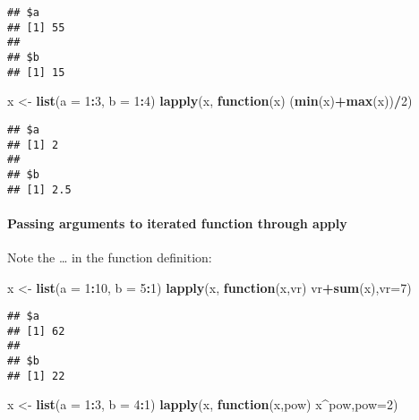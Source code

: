 \documentclass[
]{article}
\newenvironment{Shaded}{\begin{snugshade}}{\end{snugshade}}
\newcommand{\AttributeTok}[1]{\textcolor[rgb]{0.13,0.29,0.53}{#1}}
\newcommand{\ControlFlowTok}[1]{\textcolor[rgb]{0.13,0.29,0.53}{\textbf{#1}}}
\newcommand{\DecValTok}[1]{\textcolor[rgb]{0.00,0.00,0.81}{#1}}
\newcommand{\FunctionTok}[1]{\textcolor[rgb]{0.13,0.29,0.53}{\textbf{#1}}}
\newcommand{\NormalTok}[1]{#1}
\newcommand{\OtherTok}[1]{\textcolor[rgb]{0.56,0.35,0.01}{#1}}
\newcommand{\SpecialCharTok}[1]{\textcolor[rgb]{0.81,0.36,0.00}{\textbf{#1}}}
\begin{document}
\begin{verbatim}
## $a
## [1] 55
## 
## $b
## [1] 15
\end{verbatim}

\begin{Shaded}
\begin{Highlighting}[]
\NormalTok{x }\OtherTok{\textless{}{-}} \FunctionTok{list}\NormalTok{(}\AttributeTok{a =} \DecValTok{1}\SpecialCharTok{:}\DecValTok{3}\NormalTok{, }\AttributeTok{b =} \DecValTok{1}\SpecialCharTok{:}\DecValTok{4}\NormalTok{)}
\FunctionTok{lapply}\NormalTok{(x, }\ControlFlowTok{function}\NormalTok{(x) (}\FunctionTok{min}\NormalTok{(x)}\SpecialCharTok{+}\FunctionTok{max}\NormalTok{(x))}\SpecialCharTok{/}\DecValTok{2}\NormalTok{)}
\end{Highlighting}
\end{Shaded}

\begin{verbatim}
## $a
## [1] 2
## 
## $b
## [1] 2.5
\end{verbatim}

\hypertarget{passing-arguments-to-iterated-function-through-apply-1}{%
\paragraph{Passing arguments to iterated function through
apply}\label{passing-arguments-to-iterated-function-through-apply-1}}

Note the \ldots{} in the function definition:

\begin{Shaded}
\begin{Highlighting}[]
\NormalTok{x }\OtherTok{\textless{}{-}} \FunctionTok{list}\NormalTok{(}\AttributeTok{a =} \DecValTok{1}\SpecialCharTok{:}\DecValTok{10}\NormalTok{, }\AttributeTok{b =} \DecValTok{5}\SpecialCharTok{:}\DecValTok{1}\NormalTok{)}
\FunctionTok{lapply}\NormalTok{(x, }\ControlFlowTok{function}\NormalTok{(x,vr) vr}\SpecialCharTok{+}\FunctionTok{sum}\NormalTok{(x),}\AttributeTok{vr=}\DecValTok{7}\NormalTok{)}
\end{Highlighting}
\end{Shaded}

\begin{verbatim}
## $a
## [1] 62
## 
## $b
## [1] 22
\end{verbatim}

\begin{Shaded}
\begin{Highlighting}[]
\NormalTok{x }\OtherTok{\textless{}{-}} \FunctionTok{list}\NormalTok{(}\AttributeTok{a =} \DecValTok{1}\SpecialCharTok{:}\DecValTok{3}\NormalTok{, }\AttributeTok{b =} \DecValTok{4}\SpecialCharTok{:}\DecValTok{1}\NormalTok{)}
\FunctionTok{lapply}\NormalTok{(x, }\ControlFlowTok{function}\NormalTok{(x,pow) x}\SpecialCharTok{\^{}}\NormalTok{pow,}\AttributeTok{pow=}\DecValTok{2}\NormalTok{)}
\end{Highlighting}
\end{Shaded}
\end{document}
